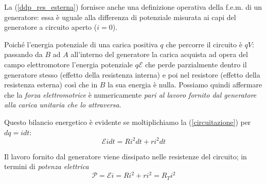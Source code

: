 \documentclass[class=book, crop=false, oneside, 12pt]{standalone}
\begin{document}
La (\ref{ddp_res_esterna}) fornisce anche una definizione operativa della f.e.m. di un generatore: essa è uguale alla differenza di potenziale misurata ai capi del generatore a  circuito aperto (\(i = 0\)). 

Poiché l'energia potenziale di una carica positiva \(q\) che percorre il circuito è \(qV\): passando da \(B\) ad \(A\) all'interno del generatore la carica acquista ad opera del campo elettromotore l'energia potenziale \(q\mathcal{E}\) che perde parzialmente dentro il generatore stesso (effetto della resistenza interna) e poi nel resistore (effetto della resistenza esterna) così che in \(B\) la sua energia è nulla. 
Possiamo quindi affermare che la \emph{forza elettromotrice} è numericamente \emph{pari al lavoro fornito dal generatore alla carica unitaria che lo attraversa}. 

Questo bilancio energetico è evidente se moltiplichiamo la (\ref{circuitazione}) per \(dq = i dt\): 
\begin{equation*}
    \mathcal{E} i dt = Ri^2 dt + r i^2 dt
\end{equation*}

Il lavoro fornito dal generatore viene dissipato nelle resistenze del circuito; in termini di \emph{potenza elettrica}
\begin{equation}
    \mathcal{P} = \mathcal{E} i = R i^2 + r i^2 = R_T i^2
\end{equation}
\end{document}
